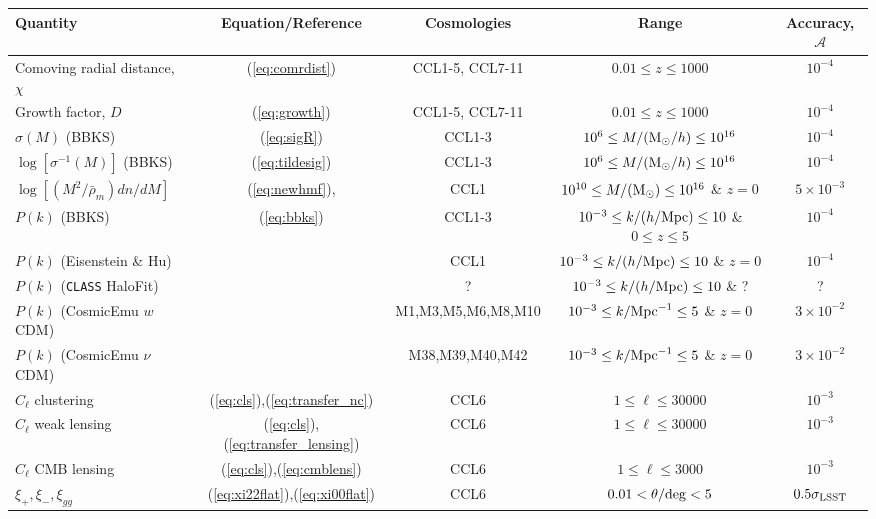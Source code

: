 
%
\begin{sidewaystable*}[!htp]
  \centering
  \begin{tabular}{ l|c c c c}
    \hline
    Quantity & Equation/Reference & Cosmologies & Range & Accuracy, $\mathcal{A}$ \\
    \hline
    Comoving radial distance, $\chi$ & (\ref{eq:comrdist}) & CCL1-5, CCL7-11 & $0.01 \leq z\leq 1000$ &  $10^{-4}$\\
    Growth factor, $D$ & (\ref{eq:growth}) & CCL1-5, CCL7-11 &  $0.01 \leq z\leq 1000 $ &  $10^{-4}$\\
    $\sigma(M)$ (BBKS) & (\ref{eq:sigR}) & CCL1-3 &  $10^6\leq M/({\rm M}_\odot/h)\leq 10^{16}$ &  $10^{-4}$\\
    $\log[\sigma^{-1}(M)]$ (BBKS) & (\ref{eq:tildesig}) & CCL1-3 &  $10^6\leq M/({\rm M}_\odot/h)\leq 10^{16}$ &  $10^{-4}$\\
    $\log[(M^2/\bar{\rho}_m)dn/dM]$  & (\ref{eq:newhmf}), \citet{Tinker2010} & CCL1 & $10^{10}\leq M/({\rm M}_\odot)\leq 10^{16}$ \& $z=0$ & $5\times 10^{-3}$\\
    $P(k)$ (BBKS) & (\ref{eq:bbks}) & CCL1-3 & $10^{-3}\leq k/(h/{\rm Mpc})\leq 10$ \& $0\leq z\leq 5$ &  $10^{-4}$\\
    $P(k)$ (Eisenstein \& Hu) & \citet{1998ApJ...496..605E}  & CCL1 & $10^{-3}\leq k/(h/{\rm Mpc})\leq 10$ \& $z=0$ & $10^{-4}$ \\
    $P(k)$ ({\tt CLASS} HaloFit) & \citet{CLASS_halofit}  & ? & $10^{-3}\leq k/(h/{\rm Mpc})\leq 10$ \& ? & ? \\
    $P(k)$ (CosmicEmu $w$CDM) & \citet{Lawrence17} & M1,M3,M5,M6,M8,M10 & $10^{-3}\leq k/{\rm Mpc}^{-1}\leq 5$ \& $z=0$  & $3\times 10^{-2}$ \\
    $P(k)$ (CosmicEmu $\nu$CDM) & \citet{Lawrence17} & M38,M39,M40,M42 & $10^{-3}\leq k/{\rm Mpc}^{-1}\leq 5$ \& $z=0$ & $3\times 10^{-2}$ \\
    $C_\ell$ clustering & (\ref{eq:cls}),(\ref{eq:transfer_nc})& CCL6 &$1 \leq \ell\leq 30000$ &  $10^{-3}$\\
    $C_\ell$ weak lensing & (\ref{eq:cls}),(\ref{eq:transfer_lensing})& CCL6 &$1 \leq \ell\leq 30000$ &  $10^{-3}$\\
    $C_\ell$ CMB lensing &(\ref{eq:cls}),(\ref{eq:cmblens}) & CCL6 & $1 \leq \ell\leq 3000$& $10^{-3}$ \\
    $\xi_+,\xi_-,\xi_{gg}$ & (\ref{eq:xi22flat}),(\ref{eq:xi00flat}) & CCL6 & $0.01< \theta/{\rm deg}< 5$&  $0.5\sigma_{\rm LSST}$\\

\end{tabular}
\end{sidewaystable*}

